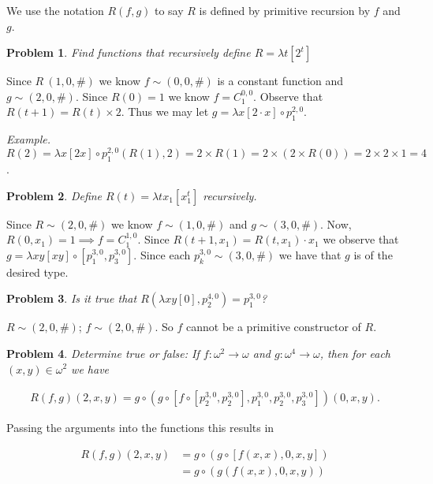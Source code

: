 \documentclass[a4paper, 12pt]{article}
\newtheorem{problem}{Problem}
\newtheorem{problem}{Problem}
\begin{document}
We use the notation $R(f, g)$ to say $R$ is defined by primitive recursion by
$f$ and $g$.


\begin{problem}
    Find functions that recursively define $R = \lambda t \left[ 2^t \right] $
\end{problem}

Since $R ~ (1, 0, \#)$ we know $f \sim (0, 0, \#)$ is a constant function and $g
\sim (2, 0, \#)$. Since $R(0) = 1$ we know $f = C_{1}^{0, 0}$. Observe that $R(t
+ 1) = R(t) \times 2$. Thus we may let $g = \lambda x [2 \cdot x] \circ
p_{1}^{2, 0}$. 

\textit{Example.} $R(2) = \lambda x[2x] \circ p_1^{2, 0} \left( R(1), 2 \right)
= 2 \times R(1) = 2 \times \left( 2 \times R(0) \right) = 2 \times 2 \times 1 =
4$.

\begin{problem}
    Define $R(t) = \lambda tx_1\left[ x_1^t \right] $ recursively.
\end{problem}

Since $R \sim (2, 0, \#)$ we know $f \sim (1, 0, \#)$ and $g \sim (3, 0, \#)$.
Now, $R(0, x_1) = 1 \implies f = C_{1}^{1, 0}$. Since $R(t + 1, x_1) = R(t, x_1)
\cdot x_1$  we observe that $g = \lambda xy[xy] \circ \left[ p_1^{3, 0},
p_{3}^{3, 0} \right] $. Since each $p_{k}^{3, 0} \sim (3, 0, \#)$ we have that
$g$ is of the desired type.

\begin{problem}
    Is it true that $R(\lambda xy[0], p_2^{4, 0}) = p_1^{3, 0}$?
\end{problem}

$R \sim (2, 0, \#)$; $f \sim (2, 0, \#)$. So $f$ cannot be a primitive
constructor of $R$.

\begin{problem}
    Determine true or false: If $f : \omega^2 \to \omega$ and $g : \omega^4 \to
    \omega$, then for each $(x, y) \in \omega^2$ we have

    \begin{align*}
        R(f, g)(2, x, y) = g \circ \left( g \circ \left[ f \circ \left[ p_2^{3,
        0}, p_2^{3, 0} \right], p_1^{3, 0}, p_2^{3, 0}, p_3^{3, 0}  \right]
    \right) (0, x, y).
    \end{align*}
\end{problem}

Passing the arguments into the functions this results in 

\begin{align*}
    R(f, g)(2, x, y) &= g \circ \left( g \circ \left[ f(x, x) , 0, x, y
    \right]\right)  \\ 
                     &= g \circ \left( g \left( f(x, x), 0, x, y \right)
                     \right)
\end{align*}
\end{document}
